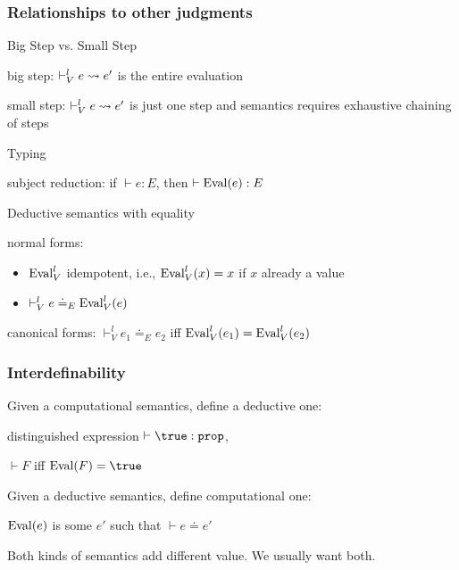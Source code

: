 \begin{frame}\frametitle{Relationships to other judgments}
\begin{blockitems}{Big Step vs. Small Step}
 \item big step: $\vdash^l_V e\rightsquigarrow e'$ is the entire evaluation
 \item small step: $\vdash^l_V e\rightsquigarrow e'$ is just one step and semantics requires exhaustive chaining of steps
\end{blockitems}

\begin{blockitems}{Typing}
 \item subject reduction: if $\vdash e:E$, then $\vdash \mathrm{Eval}(e):E$
\end{blockitems}

\begin{blockitems}{Deductive semantics with equality}
 \item normal forms:
  \begin{itemize}
  \item $\mathrm{Eval}^l_V$ idempotent, i.e., $\mathrm{Eval}^l_V(x)=x$ if $x$ already a value
  \item $\vdash^l_V e\doteq_E\mathrm{Eval}^l_V(e)$
  \end{itemize} 
 \item canonical forms: $\vdash^l_V e_1\doteq_E e_2$ iff $\mathrm{Eval}^l_V(e_1)=\mathrm{Eval}^l_V(e_2)$
\end{blockitems}
\end{frame}

\begin{frame}\frametitle{Interdefinability}
\begin{blockitems}{Given a computational semantics, define a deductive one:}
\item distinguished expression $\vdash \true:\prop$,
\item $\vdash F$ iff $\Eval(F)=\true$
\end{blockitems}

\begin{blockitems}{Given a deductive semantics, define computational one:}
\item $\mathrm{Eval}(e)$ is some $e'$ such that $\vdash e\doteq e'$
\end{blockitems}

Both kinds of semantics add different value. We usually want both.
\end{frame}

